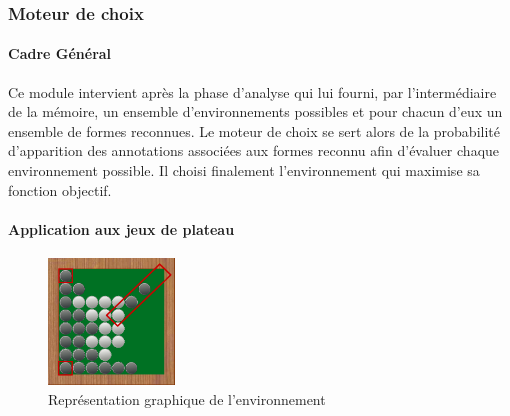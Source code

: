\subsubsection{Moteur de choix}

\paragraph{Cadre Général}


Ce module intervient après la phase d'analyse qui lui fourni, par l'intermédiaire de la mémoire, un ensemble d'environnements possibles et pour chacun d'eux un ensemble de formes reconnues. Le \og moteur de choix \fg{} se sert alors de la probabilité d'apparition des annotations associées aux formes reconnu afin d'évaluer chaque environnement possible. Il choisi finalement l'environnement qui maximise sa fonction objectif.

\paragraph{Application aux jeux de plateau}


\begin{figure}[H] 
  \begin{center}
		\includegraphics[width=0.3\textwidth]{files/raisonneur/moteur_de_choix} 
	\end{center}
\caption{Représentation graphique de l'environnement} 
\label{img_env}
\end{figure}

